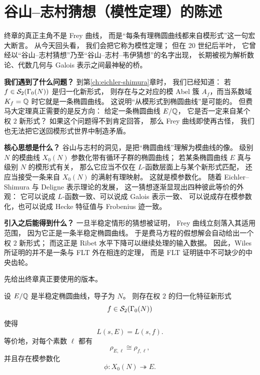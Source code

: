 \section{谷山--志村猜想（模性定理）的陈述}
\label{sec:ch10-ts}

\providecommand{\Zl}{\mathbb{Z}_\ell}
\providecommand{\Ql}{\mathbb{Q}_\ell}

终章的真正主角不是 Frey 曲线，
而是“每条有理椭圆曲线都来自模形式”这一句宏大断言。
从今天回头看，
我们会把它称为模性定理；
但在 20 世纪后半叶，
它曾经以“谷山--志村猜想”乃至“谷山--志村--韦伊猜想”的名字出现，
长期被视为解析数论、代数几何与 Galois 表示之间最神秘的桥。

\textbf{我们遇到了什么问题？}
到第\ref{ch:eichler-shimura}章时，
我们已经知道：
若 $f\in \mathcal{S}_2(\Gamma_0(N))$ 是归一化新形式，
则存在与之对应的模 Abel 簇 $A_f$，而当系数域 $K_f=\mathbb{Q}$ 时它就是一条椭圆曲线。
这说明“从模形式到椭圆曲线”是可能的。
但费马大定理真正需要的是反方向：
给定一条椭圆曲线 $E/\mathbb{Q}$，
它是否一定来自某个权 $2$ 新形式？
如果这个问题得不到肯定回答，
那么 Frey 曲线即使再古怪，
我们也无法把它送回模形式世界中制造矛盾。

\textbf{核心思想是什么？}
谷山与志村的洞见，是把“椭圆曲线”理解为模曲线的像。
级别 $N$ 的模曲线 $X_0(N)$ 参数化带有循环子群的椭圆曲线；
若某条椭圆曲线 $E$ 真与级别 $N$ 的模形式有关，
那么它应当不仅在 $L$-函数层面上与某个新形式匹配，
还应当接受一条来自 $X_0(N)$ 的满射有理映射。
这就是模参数化。
随着 Eichler--Shimura 与 Deligne 表示理论的发展，
这一猜想逐渐显现出四种彼此等价的外观：
它可以说成 $L$-函数一致、可以说成 Galois 表示一致、
可以说成存在模参数化，也可以说成 Hecke 特征值与 Frobenius 迹一致。

\textbf{引入之后能得到什么？}
一旦半稳定情形的猜想被证明，
Frey 曲线立刻落入其适用范围，
因为它正是一条半稳定椭圆曲线。
于是费马方程的假想解会自动给出一个权 $2$ 新形式；
而这正是 Ribet 水平下降可以继续处理的输入数据。
因此，Wiles 所证明的并不是一条与 FLT 外在相连的定理，
而是 FLT 证明链中不可缺少的中央齿轮。



先给出终章真正要使用的版本。

\begin{theorem}
\label{thm:wiles}
设 $E/\mathbb{Q}$ 是半稳定椭圆曲线，导子为 $N$。
则存在权 $2$ 的归一化特征新形式
\[
  f\in \mathcal{S}_2(\Gamma_0(N))
\]
使得
\[
  L(s,E)=L(s,f).
\]
等价地，对每个素数 $\ell$ 都有
\[
  \rho_{E,\ell}\cong \rho_{f,\ell},
\]
并且存在模参数化
\[
  \phi\colon X_0(N)\twoheadrightarrow E.
\]
\end{theorem}

